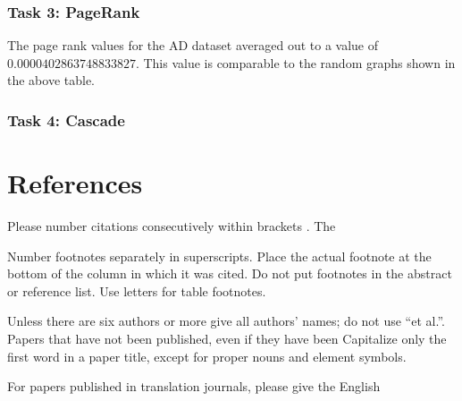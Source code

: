 \documentclass[conference]{IEEEtran}
\begin{document}
		\subsubsection{Task 3: PageRank}
			{
				The page rank values for the AD dataset averaged out to a value of $0.0000402863748833827$. This value is comparable to the random graphs shown in the above table. 
			\par}
			
		\subsubsection{Task 4: Cascade}

\section*{References}

Please number citations consecutively within brackets \cite{gnewman}. The 

Number footnotes separately in superscripts. Place the actual footnote at 
the bottom of the column in which it was cited. Do not put footnotes in the 
abstract or reference list. Use letters for table footnotes.

Unless there are six authors or more give all authors' names; do not use 
``et al.''. Papers that have not been published, even if they have been 
Capitalize only the first word in a paper title, except for proper nouns and 
element symbols.

For papers published in translation journals, please give the English 
\end{document}
